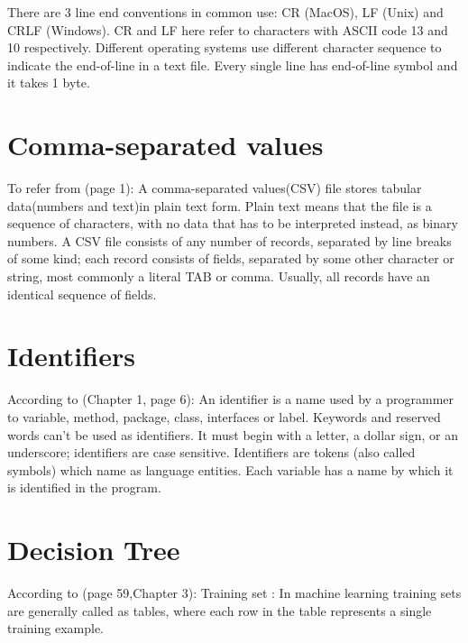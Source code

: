 \documentclass{report}
\begin{document}
There are 3 line end conventions in common use: CR (MacOS), LF (Unix) and CRLF (Windows). CR 
and LF here refer to characters with ASCII code 13 and 10 respectively. 
Different operating systems use different character sequence to indicate the end-of-line in a text file.
Every single line has end-of-line symbol and it takes 1 byte.




\section{Comma-separated values}
\label{sec:csv}

To refer from \cite{Wikipedia_CommaSeparatedValues}(page 1): A comma-separated values(CSV) file stores tabular data(numbers and text)in plain text form. Plain text means that the file is a sequence of characters, with no data that has to be interpreted instead, as binary numbers. A CSV file consists of any number of records, separated by line breaks of some kind; each record consists of fields, separated by some other character or string, most commonly a literal TAB or comma. Usually, all records have an identical sequence of fields.


\section{Identifiers}
\label{sec:ide}

According to \cite{Roberts2000CompleteJava2Certification}(Chapter 1, page 6): An identifier is a name used by a programmer to variable, method, package, class, interfaces or label. Keywords and reserved words can't be used as  identifiers. It must begin with a letter, a dollar sign, or an underscore; identifiers are case sensitive. Identifiers are tokens (also called symbols) which name as language entities. Each variable has a name by which it is identified in the program.

\section{Decision Tree}
According to \cite{Mitchell1997MachineLearning}(page 59,Chapter 3): Training set : In machine learning training sets are generally called as tables, where each row in the table represents a single training example. 
\end{document}

